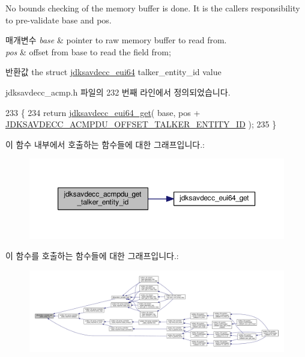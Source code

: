 No bounds checking of the memory buffer is done. It is the caller\textquotesingle{}s responsibility to pre-\/validate base and pos.


\begin{DoxyParams}{매개변수}
{\em base} & pointer to raw memory buffer to read from. \\
\hline
{\em pos} & offset from base to read the field from; \\
\hline
\end{DoxyParams}
\begin{DoxyReturn}{반환값}
the struct \hyperlink{structjdksavdecc__eui64}{jdksavdecc\+\_\+eui64} talker\+\_\+entity\+\_\+id value 
\end{DoxyReturn}


jdksavdecc\+\_\+acmp.\+h 파일의 232 번째 라인에서 정의되었습니다.


\begin{DoxyCode}
233 \{
234     \textcolor{keywordflow}{return} \hyperlink{group__eui64_ga2652311a25a6b91cddbed75c108c7031}{jdksavdecc\_eui64\_get}( base, pos + 
      \hyperlink{group__acmpdu_ga03909b777f940bcb1d5580824d528310}{JDKSAVDECC\_ACMPDU\_OFFSET\_TALKER\_ENTITY\_ID} );
235 \}
\end{DoxyCode}


이 함수 내부에서 호출하는 함수들에 대한 그래프입니다.\+:
\nopagebreak
\begin{figure}[H]
\begin{center}
\leavevmode
\includegraphics[width=350pt]{group__acmpdu_ga9efe0b94b146760a8849d872d2a00da7_cgraph}
\end{center}
\end{figure}




이 함수를 호출하는 함수들에 대한 그래프입니다.\+:
\nopagebreak
\begin{figure}[H]
\begin{center}
\leavevmode
\includegraphics[width=350pt]{group__acmpdu_ga9efe0b94b146760a8849d872d2a00da7_icgraph}
\end{center}
\end{figure}


